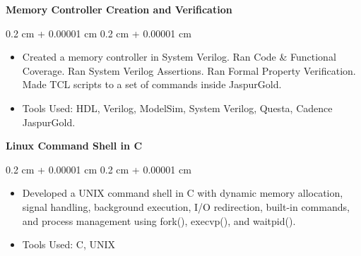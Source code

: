 \documentclass[10pt, letterpaper]{article}
\newenvironment{highlights}{
    \begin{itemize}[
        topsep=0.10 cm,
        parsep=0.10 cm,
        partopsep=0pt,
        itemsep=0pt,
        leftmargin=0.4 cm + 10pt
    ]
}{
    \end{itemize}
} %
\newenvironment{onecolentry}{
    \begin{adjustwidth}{
        0.2 cm + 0.00001 cm
    }{
        0.2 cm + 0.00001 cm
    }
}{
    \end{adjustwidth}
} %
\newenvironment{twocolentry}[2][]{
    \onecolentry
    \def\secondColumn{#2}
    \setcolumnwidth{\fill, 4.5 cm}
    \begin{paracol}{2}
}{
    \switchcolumn \raggedleft \secondColumn
    \end{paracol}
    \endonecolentry
} %
\let\hrefWithoutArrow\href
\renewcommand{\href}[2]{\hrefWithoutArrow{#1}{\ifthenelse{\equal{#2}{}}{ }{#2 }\raisebox{.15ex}{\footnotesize \faExternalLink*}}}
\begin{document}
            \textbf{Memory Controller Creation and Verification}

        \vspace{0.10 cm}
        \begin{onecolentry}
            \begin{highlights}
                \item Created a memory controller in System Verilog. Ran Code \& Functional Coverage. Ran System Verilog Assertions. Ran Formal Property Verification. Made TCL scripts to a set of commands inside JaspurGold.
                \item Tools Used: HDL, Verilog, ModelSim, System Verilog, Questa, Cadence JaspurGold.
            \end{highlights}
        \end{onecolentry}


        \vspace{0.2 cm}

            \textbf{Linux Command Shell in C}

        \vspace{0.10 cm}
        \begin{onecolentry}
            \begin{highlights}
                \item Developed a UNIX command shell in C with dynamic memory allocation, signal handling, background execution, I/O redirection, built-in commands, and process management using fork(), execvp(), and waitpid().
                \item Tools Used: C, UNIX
            \end{highlights}
        \end{onecolentry}


        \vspace{0.2 cm}

\end{document}

